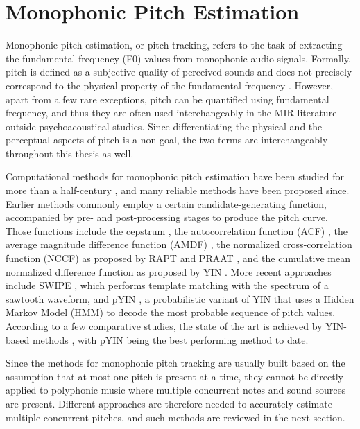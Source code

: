 \section{Monophonic Pitch Estimation}\label{sec:monophonic}

Monophonic pitch estimation, or pitch tracking, refers to the task of extracting the fundamental frequency (F0) values from monophonic audio signals.
Formally, pitch is defined as a subjective quality of perceived sounds and does not precisely correspond to the physical property of the fundamental frequency \cite{hartmann1997signals}.
However, apart from a few rare exceptions, pitch can be quantified using fundamental frequency, and thus they are often used interchangeably in the MIR literature outside psychoacoustical studies. 
Since differentiating the physical and the perceptual aspects of pitch is a non-goal, the two terms are interchangeably throughout this thesis as well.

Computational methods for monophonic pitch estimation have been studied for more than a half-century \cite{noll1967cepstrum}, and many reliable methods have been proposed since.
Earlier methods commonly employ a certain candidate-generating function, accompanied by pre- and post-processing stages to produce the pitch curve.
Those functions include the cepstrum \cite{noll1967cepstrum}, the autocorrelation function (ACF) \cite{dubnowski1976acf}, the average magnitude difference function (AMDF) \cite{ross1974amdf}, the normalized cross-correlation function (NCCF) as proposed by RAPT \cite{talkin1995rapt} and PRAAT \cite{boersma1993praat}, and the cumulative mean normalized difference function as proposed by YIN \cite{decheveigne2002yin}. More recent approaches include SWIPE \cite{camacho2008swipe}, which performs template matching with the spectrum of a sawtooth waveform, and 
pYIN \cite{mauch2014pyin}, a probabilistic variant of YIN that uses a Hidden Markov Model (HMM) to decode the most probable sequence of pitch values.
According to a few comparative studies, the state of the art is achieved by YIN-based methods \cite{von2010comparison, babacan2013comparative}, with pYIN being the best performing method to date.

Since the methods for monophonic pitch tracking are usually built based on the assumption that at most one pitch is present at a time, they cannot be directly applied to polyphonic music where multiple concurrent notes and sound sources are present.
Different approaches are therefore needed to accurately estimate multiple concurrent pitches, and such methods are reviewed in the next section.


